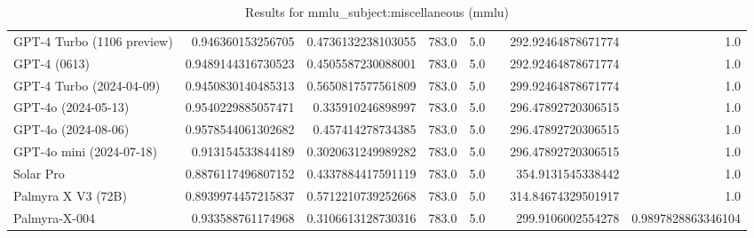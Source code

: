 \begin{table}[htp]
{\begin{tabular}{lrrrrrrr}
GPT-4 Turbo (1106 preview) & 0.946360153256705 & 0.4736132238103055 & 783.0 & 5.0 &  & 292.92464878671774 & 1.0 \\
GPT-4 (0613) & 0.9489144316730523 & 0.4505587230088001 & 783.0 & 5.0 &  & 292.92464878671774 & 1.0 \\
GPT-4 Turbo (2024-04-09) & 0.9450830140485313 & 0.5650817577561809 & 783.0 & 5.0 &  & 299.92464878671774 & 1.0 \\
GPT-4o (2024-05-13) & 0.9540229885057471 & 0.335910246898997 & 783.0 & 5.0 &  & 296.47892720306515 & 1.0 \\
GPT-4o (2024-08-06) & 0.9578544061302682 & 0.457414278734385 & 783.0 & 5.0 &  & 296.47892720306515 & 1.0 \\
GPT-4o mini (2024-07-18) & 0.913154533844189 & 0.3020631249989282 & 783.0 & 5.0 &  & 296.47892720306515 & 1.0 \\
Solar Pro & 0.8876117496807152 & 0.4337884417591119 & 783.0 & 5.0 &  & 354.9131545338442 & 1.0 \\
Palmyra X V3 (72B) & 0.8939974457215837 & 0.5712210739252668 & 783.0 & 5.0 &  & 314.84674329501917 & 1.0 \\
Palmyra-X-004 & 0.933588761174968 & 0.3106613128730316 & 783.0 & 5.0 &  & 299.9106002554278 & 0.9897828863346104 \\
\bottomrule
\end{tabular}}
\caption{Results for mmlu_subject:miscellaneous (mmlu)}
\label{fig:mmlu_subject:miscellaneous (mmlu)}
\end{table}